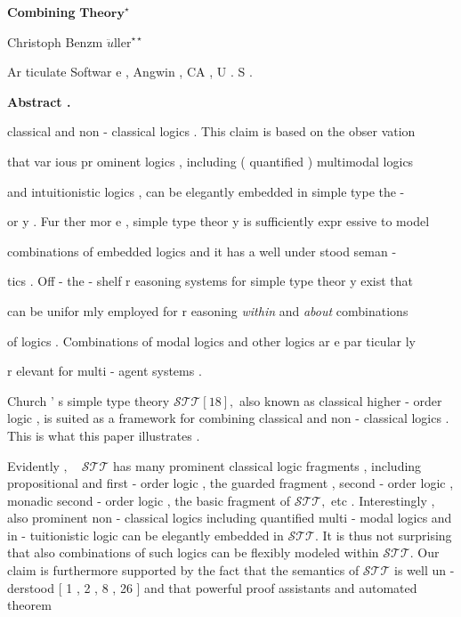 \documentclass[10pt]{article}
\begin{document}
\centerline{{\Large \textbf{Combining } }     \quad  $ \mathbf{Theory} ^{ \star }$  }

\centerline{Christoph Benzm  $ \ddot{u}  \mathrm{ller} ^{ \star  \star }$  }

\centerline{{\small Ar ticulate Softwar e , Angwin , CA , U . S . } }

\centerline{{\small \textbf{Abstract . } }   }

\centerline{{\small classical and non - classical logics . This claim is based on the obser vation } }

\centerline{{\small that var ious pr ominent logics , including ( quantified ) multimodal logics } }

\centerline{{\small and intuitionistic logics , can be elegantly embedded in simple type the - } }

\centerline{{\small or y . Fur ther mor e , simple type theor y is sufficiently expr essive to model } }

\centerline{{\small combinations of embedded logics and it has a well under stood seman - } }

\centerline{{\small tics . Off - the - shelf r easoning systems for simple type theor y exist that } }

\centerline{{\small can be unifor mly employed for r easoning \textit{within } and \textit{about } combinations } }

\centerline{{\small of logics . Combinations of modal logics and other logics ar e par ticular ly } }

\centerline{{\small r elevant for multi - agent systems . } }

  

\noindent Church ' s simple type theory  $ \mathcal{STT}   [  1  8  ]  , $  also known as classical higher - order logic , 
 is suited as a framework for combining classical and non - classical logics . This is 
 what this paper illustrates . 

Evidently  $ ,  \quad  \mathcal{STT} $  has many prominent \quad classical logic fragments , \quad including 
 propositional and first - order logic , \quad the guarded fragment , \quad second - order logic , 
 monadic second - order logic , the basic fragment of  $ \mathcal{STT}  , $  etc . Interestingly , also 
 prominent non - classical logics \quad including quantified multi - modal logics and in - 
 tuitionistic logic \quad can be elegantly embedded in  $ \mathcal{STT}  . $  It is thus not surprising 
 that also combinations of such logics can be flexibly modeled within  $ \mathcal{STT}  . $  Our 
 claim is furthermore supported by the fact that the semantics of  $ \mathcal{STT} $  is well un - 
 derstood [ 1 , 2 , 8 , 26 ] and that powerful proof assistants and automated theorem 
\end{document}
